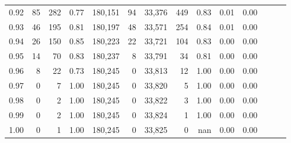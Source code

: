 \begin{tabular}{rrrrrrrrrrrrrr}
0.92 &     85 &  282 &  0.77 &  180,151 &       94 &  33,376 &     449 &  0.83 &  0.01 &      0.00 \\
0.93 &     46 &  195 &  0.81 &  180,197 &       48 &  33,571 &     254 &  0.84 &  0.01 &      0.00 \\
0.94 &     26 &  150 &  0.85 &  180,223 &       22 &  33,721 &     104 &  0.83 &  0.00 &      0.00 \\
0.95 &     14 &   70 &  0.83 &  180,237 &        8 &  33,791 &      34 &  0.81 &  0.00 &      0.00 \\
0.96 &      8 &   22 &  0.73 &  180,245 &        0 &  33,813 &      12 &  1.00 &  0.00 &      0.00 \\
0.97 &      0 &    7 &  1.00 &  180,245 &        0 &  33,820 &       5 &  1.00 &  0.00 &      0.00 \\
0.98 &      0 &    2 &  1.00 &  180,245 &        0 &  33,822 &       3 &  1.00 &  0.00 &      0.00 \\
0.99 &      0 &    2 &  1.00 &  180,245 &        0 &  33,824 &       1 &  1.00 &  0.00 &      0.00 \\
1.00 &      0 &    1 &  1.00 &  180,245 &        0 &  33,825 &       0 &   nan &  0.00 &      0.00 \\
\bottomrule
\end{tabular}
